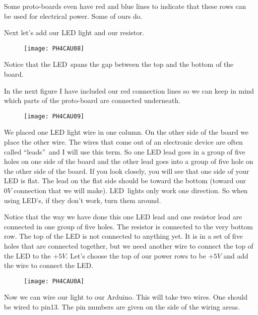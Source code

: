 Some proto-boards even have red
and blue lines to indicate that these rows can be used for electrical power.
Some of ours do.

Next let's add our LED light and our resistor. 

\begin{figure}[h!]
	\centering
	\texttt{[image: PH4CAU08]}
\end{figure}

Notice that the LED\ spans the gap between the top and the bottom of the board.

In the next figure I have included our red connection lines so we can keep
in mind which parts of the proto-board are connected underneath.

\begin{figure}[h!]
		\centering
	\texttt{[image: PH4CAU09]}
\end{figure}

We placed one LED light wire in one column. On the other side of the board
we place the other wire. The wires that come out of an electronic device are
often called \textquotedblleft leads\textquotedblright\ and I will use this
term. So one LED lead goes in a group of five holes on one side of the board
and the other lead goes into a group of five hole on the other side of the
board. If you look closely, you will see that one side of your LED is flat.
The lead on the flat side should be toward the bottom (toward our $0\unit{V}$
connection that we will make). LED\ lights only work one direction. So when
using LED's, if they don't work, turn them around.

Notice that the way we have done this one LED lead and one resistor lead are
connected in one group of five holes. The resistor is connected to the very
bottom row. The top of the LED is not connected to anything yet. It is in a
set of five holes that are connected together, but we need another wire to
connect the top of the LED to the $+5\unit{V}.$ Let's choose the top of our
power rows to be $+5\unit{V}$ and add the wire to connect the LED. 

\begin{figure}[h!]
	\centering
	\texttt{[image: PH4CAU0A]}
\end{figure}

Now we can wire our light to our Arduino. This will take two wires. One
should be wired to pin13. The pin numbers are given on the side of the
wiring areas. 

